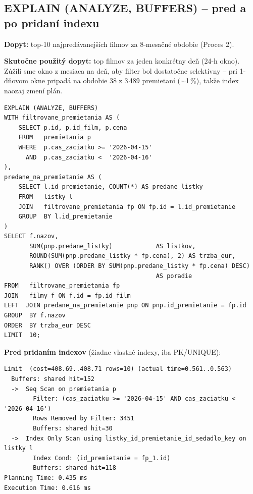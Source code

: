\documentclass[11pt, a4paper]{article}
\begin{document}
\subsection{EXPLAIN (ANALYZE, BUFFERS) -- pred a po pridaní indexu}

\textbf{Dopyt:} top-10 najpredávanejších filmov za 8-mesačné obdobie
(Proces 2).

\textbf{Skutočne použitý dopyt:} top filmov za jeden konkrétny deň (24-h
okno). Zúžili sme okno z mesiaca na deň, aby filter bol dostatočne
selektívny -- pri 1-dňovom okne pripadá na obdobie 38 z 3\,489 premietaní
($\sim$1\,\%), takže index naozaj zmení plán.

\begin{lstlisting}[caption={Analytika za jeden deň, použitá pre EXPLAIN}]
EXPLAIN (ANALYZE, BUFFERS)
WITH filtrovane_premietania AS (
    SELECT p.id, p.id_film, p.cena
    FROM   premietania p
    WHERE  p.cas_zaciatku >= '2026-04-15'
      AND  p.cas_zaciatku <  '2026-04-16'
),
predane_na_premietanie AS (
    SELECT l.id_premietanie, COUNT(*) AS predane_listky
    FROM   listky l
    JOIN   filtrovane_premietania fp ON fp.id = l.id_premietanie
    GROUP  BY l.id_premietanie
)
SELECT f.nazov,
       SUM(pnp.predane_listky)            AS listkov,
       ROUND(SUM(pnp.predane_listky * fp.cena), 2) AS trzba_eur,
       RANK() OVER (ORDER BY SUM(pnp.predane_listky * fp.cena) DESC)
                                          AS poradie
FROM   filtrovane_premietania fp
JOIN   filmy f ON f.id = fp.id_film
LEFT  JOIN predane_na_premietanie pnp ON pnp.id_premietanie = fp.id
GROUP  BY f.nazov
ORDER  BY trzba_eur DESC
LIMIT  10;
\end{lstlisting}

\textbf{Pred pridaním indexov} (žiadne vlastné indexy, iba PK/UNIQUE):
\begin{lstlisting}[caption={Plán pred indexmi -- skrátené, kľúčové uzly}]
Limit  (cost=408.69..408.71 rows=10) (actual time=0.561..0.563)
  Buffers: shared hit=152
  ->  Seq Scan on premietania p
        Filter: (cas_zaciatku >= '2026-04-15' AND cas_zaciatku < '2026-04-16')
        Rows Removed by Filter: 3451
        Buffers: shared hit=30
  ->  Index Only Scan using listky_id_premietanie_id_sedadlo_key on listky l
        Index Cond: (id_premietanie = fp_1.id)
        Buffers: shared hit=118
Planning Time: 0.435 ms
Execution Time: 0.616 ms
\end{lstlisting}
\end{document}
